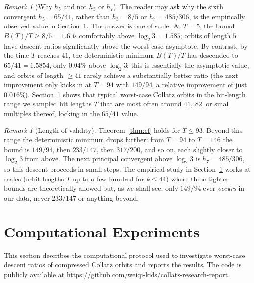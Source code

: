 \documentclass[11pt,a4paper]{article}
\theoremstyle{definition}
\theoremstyle{remark}
\newtheorem{remark}[theorem]{Remark}
\begin{document}
\begin{remark}[Why $h_5$ and not $h_3$ or $h_7$]
The reader may ask why the sixth convergent $h_5 = 65/41$, rather
than $h_3 = 8/5$ or $h_7 = 485/306$, is the empirically observed
value in Section~\ref{sec:exp}.  The answer is one of scale.  At
$T = 5$, the bound $B(T)/T \geq 8/5 = 1.6$ is comfortably above
$\log_2 3 = 1.585$; orbits of length $5$ have descent ratios
significantly above the worst-case asymptote.  By contrast, by the
time $T$ reaches $41$, the deterministic minimum $B(T)/T$ has
descended to $65/41 = 1.5854$, only $0.04\%$ above $\log_2 3$;
this is essentially the asymptotic value, and orbits of length
$\geq 41$ rarely achieve a substantially better ratio (the next
improvement only kicks in at $T = 94$ with $149/94$, a relative
improvement of just $0.016\%$).  Section~\ref{sec:exp} shows that
typical worst-case Collatz orbits in the bit-length range we
sampled hit lengths $T$ that are most often around $41$, $82$, or
small multiples thereof, locking in the $65/41$ value.
\end{remark}

\begin{remark}[Length of validity]
Theorem~\ref{thm:cf} holds for $T \leq 93$.  Beyond this range the
deterministic minimum drops further: from $T = 94$ to $T = 146$ the
bound is $149/94$, then $233/147$, then $317/200$, and so on, each
slightly closer to $\log_2 3$ from above.  The next principal
convergent above $\log_2 3$ is $h_7 = 485/306$, so this descent
proceeds in small steps.  The empirical study in
Section~\ref{sec:exp} works at scales (orbit lengths $T$ up to a few
hundred for $k \leq 44$) where these tighter bounds are theoretically
allowed but, as we shall see, only $149/94$ ever \emph{occurs} in
our data, never $233/147$ or anything beyond.
\end{remark}

\section{Computational Experiments}\label{sec:exp}

This section describes the computational protocol used to investigate
worst-case descent ratios of compressed Collatz orbits and reports
the results.  The code is publicly available at
\url{https://github.com/weiqi-kids/collatz-research-report}.
\end{document}
